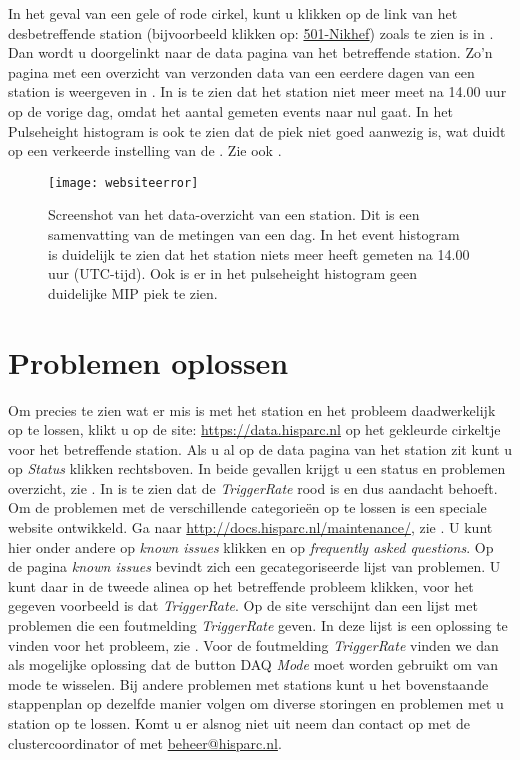 In het geval van een gele of rode cirkel, kunt u klikken op de link van
het desbetreffende station (bijvoorbeeld klikken op:
\underline{501-Nikhef}) zoals te zien is in . Dan
wordt u doorgelinkt naar de data pagina van het betreffende station.
Zo'n pagina met een overzicht van verzonden data van een eerdere dagen
van een station is weergeven in . In
 is te zien dat het station niet meer meet na
14.00 uur op de vorige dag,  omdat het aantal gemeten events naar nul
gaat. In het Pulseheight histogram is ook te zien dat de \mip piek niet
goed aanwezig is, wat duidt op een verkeerde instelling van de \pmt. Zie
ook \cite{inregelen}.

\begin{figure} 
    \centering 
    \texttt{[image: websiteerror]}
    \caption{Screenshot van het data-overzicht van een station. Dit is
             een samenvatting van de metingen van een dag. In het event
             histogram is duidelijk te zien dat het station niets meer
             heeft gemeten na 14.00 uur (UTC-tijd). Ook is er in het
             pulseheight histogram geen duidelijke MIP piek te zien.}
    \label{fig:websiteerror} 
\end{figure}


\section{Problemen oplossen}

Om precies te zien wat er mis is met het station en het probleem
daadwerkelijk op te lossen, klikt u op de site:
\url{https://data.hisparc.nl} op het gekleurde cirkeltje voor het
betreffende station. Als u al op de data pagina van het station zit kunt
u op \emph{Status} klikken rechtsboven. In beide gevallen krijgt u een
status en problemen overzicht, zie . In
 is te zien dat de \emph{TriggerRate} rood is
en dus aandacht behoeft. Om de problemen met de verschillende
categorieën op te lossen is een speciale website ontwikkeld. Ga naar
\url{http://docs.hisparc.nl/maintenance/}, zie .
U kunt hier onder andere op \emph{known issues} klikken en op
\emph{frequently asked questions}. Op de pagina \emph{known issues}
bevindt zich een gecategoriseerde lijst van problemen. U kunt daar in de
tweede alinea op het betreffende probleem klikken, voor het gegeven
voorbeeld is dat \emph{TriggerRate}. Op de site verschijnt dan een lijst
met problemen die een foutmelding \emph{TriggerRate} geven. In deze
lijst is een oplossing te vinden voor het probleem, zie
. Voor de foutmelding \emph{TriggerRate} vinden we
dan als mogelijke oplossing dat de button DAQ \emph{Mode} moet worden
gebruikt om van mode te wisselen. Bij andere problemen met stations kunt
u het bovenstaande stappenplan op dezelfde manier volgen om diverse
storingen en problemen met u station op te lossen. Komt u er alsnog niet
uit neem dan contact op met de clustercoordinator of met
\url{beheer@hisparc.nl}.
 

